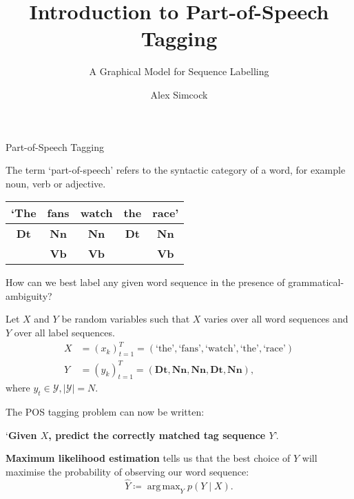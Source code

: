 \documentclass[envcountsect]{beamer}
\title{Introduction to Part-of-Speech Tagging}
\subtitle{A Graphical Model for Sequence Labelling}
\author{Alex Simcock}
\institute{University of Birmingham}
\date{}
\newcommand{\yhat}{\hat{Y}}
\newcommand{\boldX}{X}
\newcommand{\boldY}{Y}
\DeclareMathOperator*{\argmax}{arg\,max}
\begin{document}
\begin{frame}
\titlepage
\end{frame}

\begin{frame}{Part-of-Speech Tagging}

\begin{definition}
The term `part-of-speech' refers to the syntactic category of a word, for example noun, verb or adjective.
\end{definition}

\begin{example}
\begin{center}
\begin{tabular}{ c c c c c }
 `The & fans & watch & the & race' \\
 \hline
 \textbf{Dt} & \textbf{Nn} & \textbf{Nn} & \textbf{Dt} & \textbf{Nn} \\  
 & \textbf{Vb} & \textbf{Vb} & & \textbf{Vb}    
\end{tabular}
\end{center}
\end{example}

How can we best label any given word sequence in the presence of grammatical-ambiguity?


\end{frame}

\begin{frame}

\begin{definition}

Let $\boldX$ and $\boldY$ be random variables such that $\boldX$ varies over all word sequences and $\boldY$ over all label sequences.
\begin{align*}
    \boldX &= (x_k)_{t=1}^T = (\text{`the'}, \text{`fans'}, \text{`watch'}, \text{`the'}, \text{`race'}) \\
    \boldY &= (y_k)_{t=1}^T = (\textbf{Dt}, \textbf{Nn}, \textbf{Nn}, \textbf{Dt}, \textbf{Nn}),
\end{align*}
where $y_t \in \mathcal{Y}, |\mathcal{Y}|=N$.

The POS tagging problem can now be written:

`\textbf{Given $\boldX$, predict the correctly matched tag sequence $\boldY$}'.

\end{definition}

\pause

\textbf{Maximum likelihood estimation} tells us that the best choice of $\boldY$ will maximise the probability of observing our word sequence:
\begin{equation*}
    \yhat \coloneqq \argmax_{\boldY} p(\boldY \mid \boldX).
\end{equation*}    

\end{frame}
\end{document}
